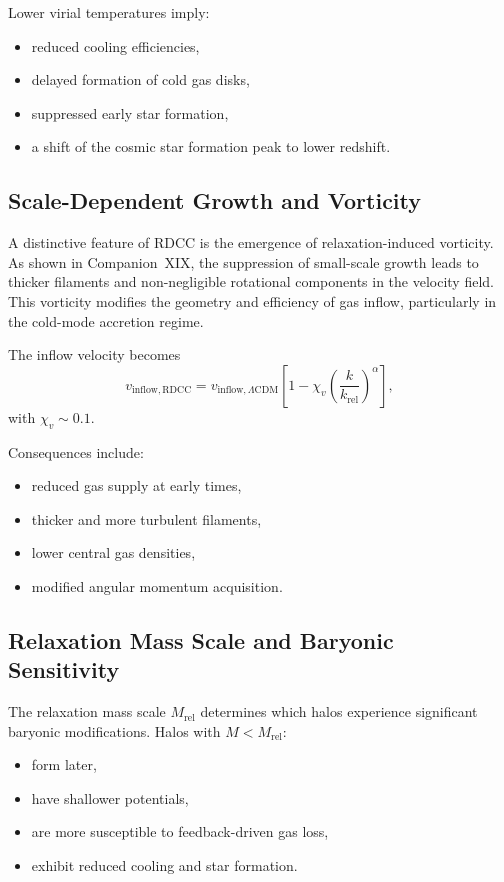 \documentclass[11pt,a4paper]{article}
\begin{document}
Lower virial temperatures imply:
\begin{itemize}
\item reduced cooling efficiencies,
\item delayed formation of cold gas disks,
\item suppressed early star formation,
\item a shift of the cosmic star formation peak to lower redshift.
\end{itemize}

\subsection{Scale-Dependent Growth and Vorticity}

A distinctive feature of RDCC is the emergence of relaxation-induced vorticity. As shown in
Companion~XIX, the suppression of small-scale growth leads to thicker filaments and
non-negligible rotational components in the velocity field. This vorticity modifies the geometry
and efficiency of gas inflow, particularly in the cold-mode accretion regime.

The inflow velocity becomes
\begin{equation}
v_{\mathrm{inflow,RDCC}}
=
v_{\mathrm{inflow},\Lambda\mathrm{CDM}}
\left[
1
-
\chi_{v}
\left(
\frac{k}{k_{\mathrm{rel}}}
\right)^{\alpha}
\right],
\end{equation}
with $\chi_{v} \sim 0.1$.

Consequences include:
\begin{itemize}
\item reduced gas supply at early times,
\item thicker and more turbulent filaments,
\item lower central gas densities,
\item modified angular momentum acquisition.
\end{itemize}

\subsection{Relaxation Mass Scale and Baryonic Sensitivity}

The relaxation mass scale $M_{\mathrm{rel}}$ determines which halos experience significant
baryonic modifications. Halos with $M < M_{\mathrm{rel}}$:
\begin{itemize}
\item form later,
\item have shallower potentials,
\item are more susceptible to feedback-driven gas loss,
\item exhibit reduced cooling and star formation.
\end{itemize}
\end{document}
